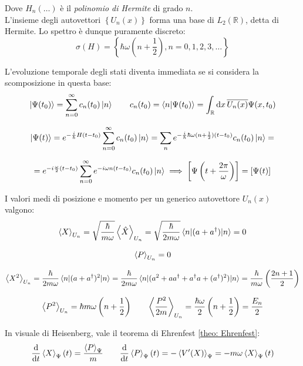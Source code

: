 Dove \(H_n(\dots)\) è il \textit{polinomio di Hermite} di grado \(n\).\\
L'insieme degli autovettori \(\left\{ U_n(x) \right\}\) forma una base di \(L_2(\mathbb{R})\), detta di Hermite.
Lo spettro è dunque puramente discreto:
\[
    \sigma(H)= \left\{ \hbar\omega(n + \frac{1}{2}), n = 0,1,2,3,\dots \right\}
\]

L'evoluzione temporale degli stati diventa immediata se si considera la scomposizione in questa base:
\[
    \ket{\Psi(t_0)}  = \sum_{n= 0}^{\infty} c_n(t_0) \ket{n}  \qquad c_n(t_0) = \braket{n}{\Psi(t_0)}  = \int_\mathbb{R} \dd{x} \overline{U_n(x)} \Psi(x, t_0)
\]

\[
    \ket{\Psi(t)}  = e ^{-\frac{i}{\hbar}H (t-t_0)}\sum_{n= 0}^{\infty} c_n (t_0)\ket{n} = \sum_{n} e ^{-\frac{i}{\hbar}\hbar\omega(n + \frac{1}{2})(t-t_0)}c_n(t_0)\ket{n}=
\]

\[
    = e^{-i\frac{\omega}{2}(t-t_0)}\sum_{n = 0}^{\infty} e ^{-i\omega n(t-t_0)}c_n(t_0)\ket{n} \implies \left[ \Psi\left(t+ \frac{2\pi}{\omega}\right) \right]= \left[ \Psi(t) \right]
\]

I valori medi di posizione e momento per un generico autovettore \(U_n(x)\) valgono:
\begin{equation}
    \expval{X}_{U_n} 
        = \sqrt{\frac{\hbar}{m\omega}} \expval{\hat{X}}_{U_n} 
        = \sqrt{\frac{\hbar}{2m\omega}} \mel{n}{(a + a^\dagger)}{n} = 0
\end{equation}

\begin{equation}
    \expval{P}_{U_n} = 0
\end{equation}

\begin{equation}
    \expval{X^2}_{U_n} 
        = \frac{\hbar}{2m\omega} \mel{n}{(a + a^\dagger)^2}{n}
        = \frac{\hbar}{2m\omega} \mel{n}{(a^2 + a a^\dagger + a^\dagger a + (a^\dagger)^2)}{n}
        = \frac{\hbar}{m\omega} \left( \frac{2n + 1}{2} \right)
\end{equation}

\begin{equation}
    \expval{P^2}_{U_n} = \hbar m \omega \left( n + \frac{1}{2} \right)
        \qquad
        \expval{\frac{P^2}{2m}}_{U_n} 
        = \frac{\hbar \omega}{2} \left( n + \frac{1}{2} \right)
        = \frac{E_n}{2}    
\end{equation}

In visuale di Heisenberg, vale il teorema di Ehrenfest \ref{theo: Ehrenfest}:
\begin{equation}
    \dv{t}\expval{X}_{\Psi}(t) = \frac{\expval{P}_{\Psi}}{m}\qquad 
        \dv{t}\expval{P}_{\Psi}(t)= - \expval{V'(X)}_{\Psi}= - m\omega\expval{X}_{\Psi}(t)
\end{equation}


